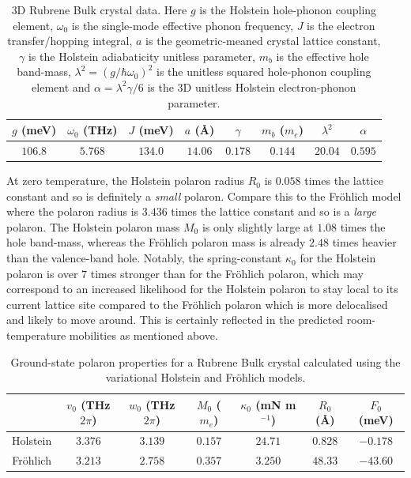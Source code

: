 \begin{table}
    \centering
    \begin{tabular}{|c|c|c|c|c|c|c|c|}
    \hline
        $g$ (meV) & $\omega_0$ (THz) & $J$ (meV) & $a$ (Å) & $\gamma$ & $m_b$ ($m_e$) & $\lambda^2$ & $\alpha$ \\
    \hline
         $106.8$ & $5.768$ & $134.0$ & $14.06$ & $0.178$ & $0.144$ & $20.04$ & $0.595$ \\
    \hline
    \end{tabular}
    \caption{3D Rubrene Bulk crystal data. Here $g$ is the Holstein hole-phonon coupling element, $\omega_0$ is the single-mode effective phonon frequency, $J$ is the electron transfer/hopping integral, $a$ is the geometric-meaned crystal lattice constant, $\gamma$ is the Holstein adiabaticity unitless parameter, $m_b$ is the effective hole band-mass, $\lambda^2 = (g / \hbar\omega_0)^2$ is the unitless squared hole-phonon coupling element and $\alpha = \lambda^2 \gamma / 6$ is the 3D unitless Holstein electron-phonon parameter.}
    \label{tab:rubrene}
\end{table}

At zero temperature, the Holstein polaron radius $R_0$ is $0.058$ times the lattice constant and so is definitely a \emph{small} polaron. Compare this to the Fr\"ohlich model where the polaron radius is $3.436$ times the lattice constant and so is a \emph{large} polaron. The Holstein polaron mass $M_0$ is only slightly large at $1.08$ times the hole band-mass, whereas the Fr\"ohlich polaron mass is already $2.48$ times heavier than the valence-band hole. Notably, the spring-constant $\kappa_0$ for the Holstein polaron is over $7$ times stronger than for the Fr\"ohlich polaron, which may correspond to an increased likelihood for the Holstein polaron to stay local to its current lattice site compared to the Fr\"ohlich polaron which is more delocalised and likely to move around. This is certainly reflected in the predicted room-temperature mobilities as mentioned above.
\newline

\begin{table}
    \centering
    \begin{tabular}{|c|c|c|c|c|c|c|}
    \hline
        & $v_0$ (THz$2\pi$) & $w_0$ (THz$2\pi$) & $M_0$ ($m_e$) &  $\kappa_0$ (mN m$^{-1}$) & $R_0$ (Å) & $F_0$ (meV) \\
    \hline
         Holstein & $3.376$ & $3.139$ & $0.157$ & $24.71$ & $0.828$ & $-0.178$ \\
    \hline
         Fr\"ohlich & $3.213$ & $2.758$ & $0.357$ & $3.250$ & $48.33$ & $-43.60$ \\
    \hline
    \end{tabular}
    \caption{Ground-state polaron properties for a Rubrene Bulk crystal calculated using the variational Holstein and Fr\"ohlich models.}
    \label{tab:rubrenegs}
\end{table}


